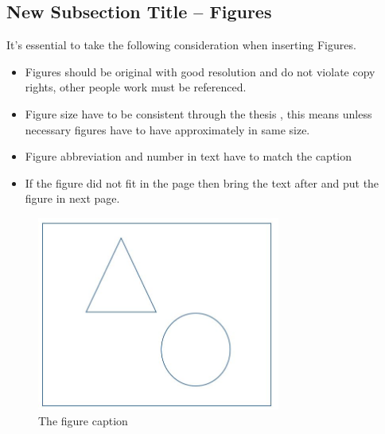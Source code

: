 \subsection{New Subsection Title – Figures}
\begin{justify}

    It's essential to take the following consideration when inserting Figures.
    
    \begin{itemize}
        \item Figures should be original with good resolution and do not violate copy rights, other people work must be referenced.
        \item Figure size have to be consistent through the thesis , this means unless necessary figures have to have approximately in same size.
        \item Figure abbreviation and number in text have to match the caption 
        \item If the figure did not fit in the page then bring the text after and put the figure in next page.
    \end{itemize}


    \begin{figure}[H]
        \centerline{\includegraphics[width=80mm,scale=1]{figures/figure.jpg}}
        \caption{The figure caption}
        \label{fig}
    \end{figure}
    
\end{justify}

